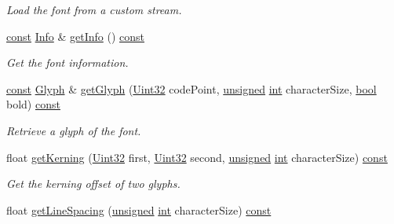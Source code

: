 \begin{DoxyCompactItemize}
\begin{DoxyCompactList}\small\item\em Load the font from a custom stream. \end{DoxyCompactList}\item 
\hyperlink{term__entry_8h_a57bd63ce7f9a353488880e3de6692d5a}{const} \hyperlink{structsf_1_1_font_1_1_info}{Info} \& \hyperlink{classsf_1_1_font_ac4b60eeb5adfc98a2c7727a0f3ce1029}{get\-Info} () \hyperlink{term__entry_8h_a57bd63ce7f9a353488880e3de6692d5a}{const} 
\begin{DoxyCompactList}\small\item\em Get the font information. \end{DoxyCompactList}\item 
\hyperlink{term__entry_8h_a57bd63ce7f9a353488880e3de6692d5a}{const} \hyperlink{classsf_1_1_glyph}{Glyph} \& \hyperlink{classsf_1_1_font_a148eb92890113052f12f8a231ad619b9}{get\-Glyph} (\hyperlink{namespacesf_aa746fb1ddef4410bddf198ebb27e727c}{Uint32} code\-Point, \hyperlink{curses_8priv_8h_aca40206900cfc164654362fa8d4ad1e6}{unsigned} \hyperlink{term__entry_8h_ad65b480f8c8270356b45a9890f6499ae}{int} character\-Size, \hyperlink{term__entry_8h_a002004ba5d663f149f6c38064926abac}{bool} bold) \hyperlink{term__entry_8h_a57bd63ce7f9a353488880e3de6692d5a}{const} 
\begin{DoxyCompactList}\small\item\em Retrieve a glyph of the font. \end{DoxyCompactList}\item 
float \hyperlink{classsf_1_1_font_a03b32e8cf6448d269f6dd9d69c138f68}{get\-Kerning} (\hyperlink{namespacesf_aa746fb1ddef4410bddf198ebb27e727c}{Uint32} first, \hyperlink{namespacesf_aa746fb1ddef4410bddf198ebb27e727c}{Uint32} second, \hyperlink{curses_8priv_8h_aca40206900cfc164654362fa8d4ad1e6}{unsigned} \hyperlink{term__entry_8h_ad65b480f8c8270356b45a9890f6499ae}{int} character\-Size) \hyperlink{term__entry_8h_a57bd63ce7f9a353488880e3de6692d5a}{const} 
\begin{DoxyCompactList}\small\item\em Get the kerning offset of two glyphs. \end{DoxyCompactList}\item 
float \hyperlink{classsf_1_1_font_a0a9b9ab6aaa50a572057127aec7c3adc}{get\-Line\-Spacing} (\hyperlink{curses_8priv_8h_aca40206900cfc164654362fa8d4ad1e6}{unsigned} \hyperlink{term__entry_8h_ad65b480f8c8270356b45a9890f6499ae}{int} character\-Size) \hyperlink{term__entry_8h_a57bd63ce7f9a353488880e3de6692d5a}{const} 

\end{DoxyCompactItemize}
